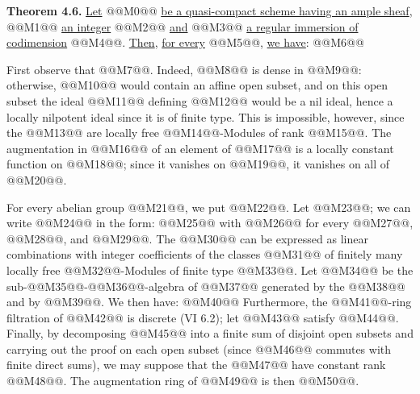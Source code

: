 \textbf{Theorem 4.6.}
\uline{Let} @@M0@@ \uline{be a quasi-compact scheme having an ample sheaf}, @@M1@@ \uline{an integer} @@M2@@ \uline{and} @@M3@@ \uline{a regular immersion of codimension} @@M4@@. \uline{Then}, \uline{for every} @@M5@@, \uline{we have}:
@@M6@@

First observe that @@M7@@. Indeed, @@M8@@ is dense in @@M9@@: otherwise, @@M10@@ would contain an affine open subset, and on this open subset the ideal @@M11@@ defining @@M12@@ would be a nil ideal, hence a locally nilpotent ideal since it is of finite type. This is impossible, however, since the @@M13@@ are locally free @@M14@@-Modules of rank @@M15@@. The augmentation in @@M16@@ of an element of @@M17@@ is a locally constant function on @@M18@@; since it vanishes on @@M19@@, it vanishes on all of @@M20@@.

For every abelian group @@M21@@, we put @@M22@@. Let @@M23@@; we can write @@M24@@ in the form:
@@M25@@
with @@M26@@ for every @@M27@@, @@M28@@, and @@M29@@. The @@M30@@ can be expressed as linear combinations with integer coefficients of the classes @@M31@@ of finitely many locally free @@M32@@-Modules of finite type @@M33@@. Let @@M34@@ be the sub-@@M35@@-@@M36@@-algebra of @@M37@@ generated by the @@M38@@ and by @@M39@@. We then have:
@@M40@@
Furthermore, the @@M41@@-ring filtration of @@M42@@ is discrete (VI 6.2); let @@M43@@ satisfy @@M44@@. Finally, by decomposing @@M45@@ into a finite sum of disjoint open subsets and carrying out the proof on each open subset (since @@M46@@ commutes with finite direct sums), we may suppose that the @@M47@@ have constant rank @@M48@@. The augmentation ring of @@M49@@ is then @@M50@@.
